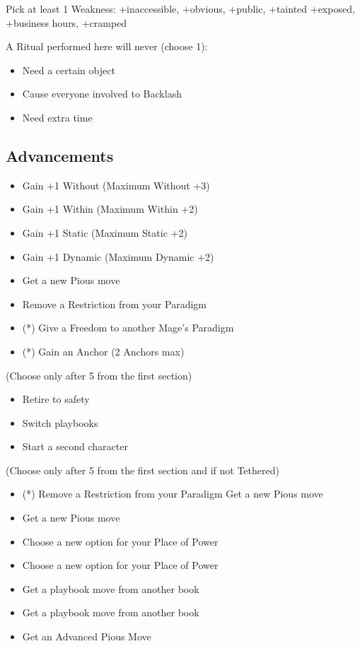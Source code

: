 \documentclass[
  oneside,
  statementpaper,
  9pt]{memoir}
\begin{document}
Pick at least 1 Weakness: +inaccessible, +obvious, +public, +tainted
+exposed, +business hours, +cramped

A Ritual performed here will never (choose 1):

\begin{itemize}
\tightlist
\item
  Need a certain object
\item
  Cause everyone involved to Backlash
\item
  Need extra time
\end{itemize}

\hypertarget{advancements-4}{%
\subsection{Advancements}\label{advancements-4}}

\begin{itemize}
\tightlist
\item
  Gain +1 Without (Maximum Without +3)
\item
  Gain +1 Within (Maximum Within +2)
\item
  Gain +1 Static (Maximum Static +2)
\item
  Gain +1 Dynamic (Maximum Dynamic +2)
\item
  Get a new Pious move
\item
  Remove a Restriction from your Paradigm
\item
  (*) Give a Freedom to another Mage's Paradigm
\item
  (*) Gain an Anchor (2 Anchors max)
\end{itemize}

(Choose only after 5 from the first section)

\begin{itemize}
\tightlist
\item
  Retire to safety
\item
  Switch playbooks
\item
  Start a second character
\end{itemize}

(Choose only after 5 from the first section and if not Tethered)

\begin{itemize}
\tightlist
\item
  (*) Remove a Restriction from your Paradigm Get a new Pious move
\item
  Get a new Pious move
\item
  Choose a new option for your Place of Power
\item
  Choose a new option for your Place of Power
\item
  Get a playbook move from another book
\item
  Get a playbook move from another book
\item
  Get an Advanced Pious Move
\end{itemize}
\end{document}
